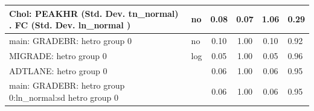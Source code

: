 \begin{table}
\begin{center}
\begin{tabular}{|l|l|c|c|c|l|}
			\hline
			 Chol: PEAKHR (Std. Dev. tn_normal) . FC (Std. Dev.   ln_normal ) & no & 0.08 & 0.07 & 1.06 & 0.29 \\
			\hline
			main: GRADEBR: hetro group 0 & no & 0.10 & 1.00 & 0.10 & 0.92 \\
			\hline
			MIGRADE: hetro group 0 & log & 0.05 & 1.00 & 0.05 & 0.96 \\
			\hline
			ADTLANE: hetro group 0 &  & 0.06 & 1.00 & 0.06 & 0.95 \\
			\hline
			main: GRADEBR: hetro group 0:ln_normal:sd  hetro group 0 &  & 0.06 & 1.00 & 0.06 & 0.95 \\
			\hline
		\end{tabular}
	\end{center}
\end{table}
